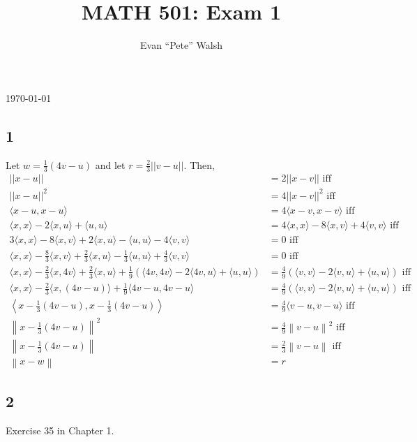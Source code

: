 \documentclass[11pt]{amsart}
\begin{document}
\title{MATH 501: Exam 1}
\author{Evan ``Pete'' Walsh}
\today
\maketitle

\subsection*{1} Let $w = \frac{1}{3}(4v - u)$ and let $r = \frac{2}{3}||v - u||$. Then,
\begin{align*}
  ||x - u|| & = 2||x - v|| \text{ iff} \\
  ||x - u||^{2} & = 4||x - v||^{2} \text{ iff} \\
  \langle x - u, x - u \rangle & = 4 \langle x - v, x - v\rangle \text{ iff} \\
  \langle x, x \rangle - 2\langle x,u \rangle + \langle u,u\rangle & = 4 \langle x,x \rangle - 8\langle x,v\rangle + 4\langle v,v\rangle \text{ iff} \\
  3\langle x,x \rangle - 8\langle x,v \rangle + 2\langle x,u\rangle - \langle u,u\rangle - 4\langle v,v\rangle & = 0 \text{ iff} \\
  \langle x,x \rangle - \frac{8}{3}\langle x,v \rangle + \frac{2}{3}\langle x,u \rangle  - \frac{1}{3}\langle u,u\rangle + \frac{4}{3}\langle v,v \rangle & = 0 \text{ iff} \\
  \langle x,x\rangle - \frac{2}{3}\langle x,4v\rangle + \frac{2}{3}\langle x,u\rangle + \frac{1}{9}\left(\langle 4v,4v\rangle - 2\langle 4v, u\rangle + \langle u,u\rangle \right) & = \frac{4}{9} \left( \langle v,v \rangle - 2\langle v,u\rangle + \langle u,u\rangle\right) \text{ iff} \\
  \langle x,x \rangle - \frac{2}{3}\langle x, (4v-u)\rangle + \frac{1}{9}\langle 4v - u, 4v - u\rangle & = \frac{4}{9}\left(\langle v,v \rangle - 2\langle v,u\rangle + \langle u,u\rangle \right) \text{ iff} \\
  \left\langle x - \frac{1}{3}(4v - u), x - \frac{1}{3}(4v - u)\right\rangle & = \frac{4}{9}\langle v - u, v - u\rangle \text{ iff} \\
  \left\|x - \frac{1}{3}(4v - u)\right\|^{2} & = \frac{4}{9}\left\|v - u\right\|^{2} \text{ iff} \\
  \left\|x - \frac{1}{3}(4v - u)\right\| & = \frac{2}{3}\left\|v - u\right\| \text{ iff} \\
  \left\|x - w\right\| & = r
\end{align*}

\subsection*{2} Exercise 35 in Chapter 1. \\
\end{document}
